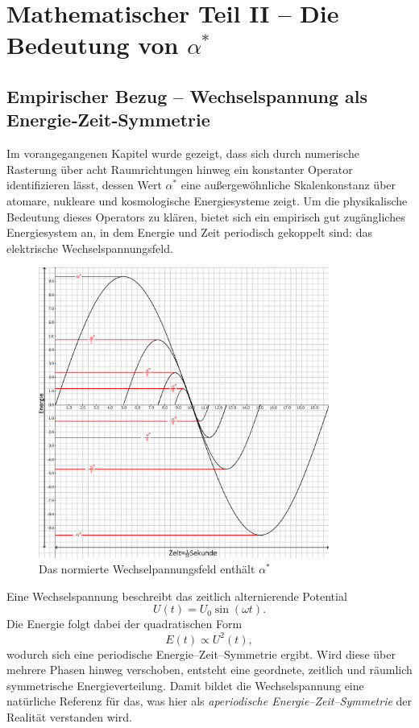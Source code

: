 \chapter{Mathematischer Teil II – Die Bedeutung von $\alpha^*$}
\label{chap:mathematischer_rahmen_II}

\section{Empirischer Bezug – Wechselspannung als Energie‐Zeit‐Symmetrie}

Im vorangegangenen Kapitel wurde gezeigt, dass sich durch numerische Rasterung
über acht Raumrichtungen hinweg ein konstanter Operator identifizieren lässt,
dessen Wert $\alpha^*$ eine außergewöhnliche Skalenkonstanz über atomare,
nukleare und kosmologische Energiesysteme zeigt.
Um die physikalische Bedeutung dieses Operators zu klären,
bietet sich ein empirisch gut zugängliches Energiesystem an,
in dem Energie und Zeit periodisch gekoppelt sind:
das elektrische Wechselspannungsfeld.

\begin{figure}
  \centering
  \includegraphics[width=0.85\textwidth]{Grafiken/Wechselspannung.jpg}
  \caption{Das normierte Wechselpannungsfeld enthält $\alpha^*$}
  \label{Diagramm1}
\end{figure}

Eine Wechselspannung beschreibt das zeitlich alternierende Potential
\[
U(t) = U_0 \sin(\omega t).
\]
Die Energie folgt dabei der quadratischen Form
\[
E(t) \propto U^2(t),
\]
wodurch sich eine periodische Energie–Zeit–Symmetrie ergibt.
Wird diese über mehrere Phasen hinweg verschoben,
entsteht eine geordnete, zeitlich und räumlich
symmetrische Energieverteilung.
Damit bildet die Wechselspannung eine natürliche Referenz
für das, was hier als \emph{aperiodische Energie–Zeit–Symmetrie}
der Realität verstanden wird.

